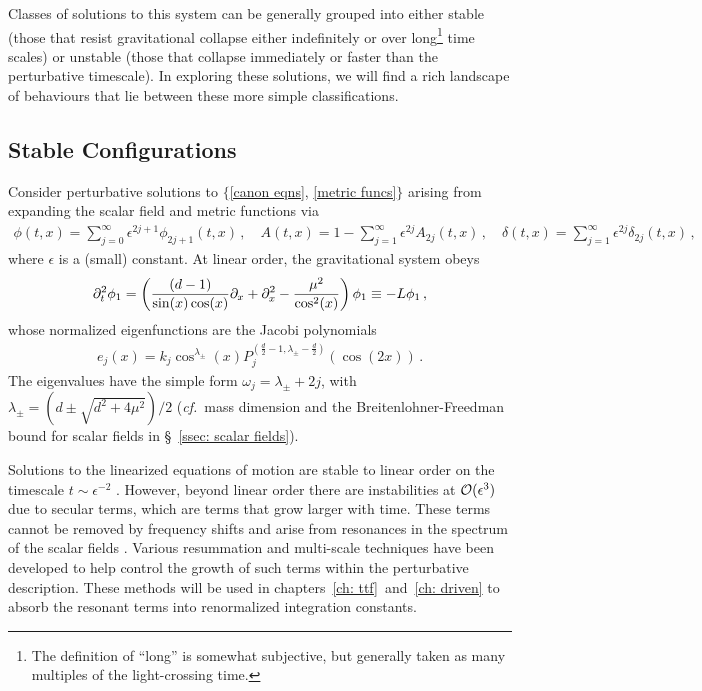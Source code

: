 \documentclass[../PhD.tex]{subfiles}
\begin{document}
Classes of solutions to this system can be generally grouped into either stable (those that resist gravitational collapse either indefinitely or over long\footnote{The definition of ``long'' is somewhat subjective, but generally taken as many multiples of the light-crossing time.} time scales) or unstable (those that collapse immediately or faster than the perturbative timescale). In exploring these solutions, we will find a rich landscape of behaviours that lie between these more simple classifications.

\subsection{Stable Configurations}

Consider perturbative solutions to $\{$\eqref{canon eqns}, \eqref{metric funcs}$\}$ arising from expanding the scalar field and metric functions via
\begin{align}
\phi(t,x) = \sum_{j=0}^{\infty} \epsilon^{2j + 1} \phi_{2j + 1} (t,x) \, , \quad A(t,x) = 1 - \sum_{j=1}^\infty \epsilon^{2j} A_{2j} (t,x) \, , \quad \delta(t,x) = \sum_{j=1}^\infty \epsilon^{2j} \delta_{2j} (t,x) \, ,
\end{align}
where $\epsilon$ is a (small) constant. At linear order, the gravitational system obeys
\begin{align}
\label{collapse eigen eqn}
\partial_t^2 \phi_1 = \left( \frac{ (d-1)}{\sin (x) \cos (x)} \partial_x + \partial^2_x - \frac{\mu^2}{\cos^2 (x)} \right) \phi_1 \equiv - L \phi_1 \, ,
\end{align}
whose normalized eigenfunctions are the Jacobi polynomials
\begin{align}
\label{scalar eigens}
e_j (x) = k_j \cos^{\lambda_\pm}(x) P_j^{(\frac{d}{2} - 1, \lambda_\pm - \frac{d}{2})} \left( \cos \left( 2x \right)\right) \, .
\end{align}
The eigenvalues have the simple form $\omega_j = \lambda_\pm + 2j$, with $\lambda_\pm = (d \pm \sqrt{d^2 + 4\mu^2})/2$ ({\it cf.}~mass dimension and the Breitenlohner-Freedman bound for scalar fields in \S~\!\ref{ssec: scalar fields}). 

Solutions to the linearized equations of motion are stable to linear order on the timescale $t \sim \epsilon^{-2}$ \cite{1506.07907}. However, beyond linear order there are instabilities at $\mathcal O(\epsilon^3)$ due to secular terms, which are terms that grow larger with time. These terms cannot be removed by frequency shifts and arise from resonances in the spectrum of the scalar fields \cite{1407.6273}. Various resummation \cite{hep-th/9506161} and multi-scale techniques \cite{1403.6471} have been developed to help control the growth of such terms within the perturbative description. These methods will be used in chapters~\ref{ch: ttf}~and~\ref{ch: driven} to absorb the resonant terms into renormalized integration constants.
\end{document}
